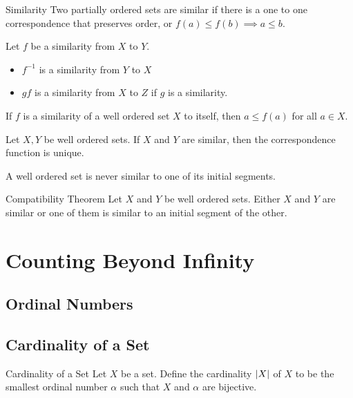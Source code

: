 \documentclass[a4paper]{article}
\begin{document}
\begin{defn}{Similarity}{} Two partially ordered sets are similar if there is a one to one correspondence that preserves order, or $f(a)\leq f(b)\implies a\leq b$. 
\end{defn}

\begin{prp}{}{} Let $f$ be a similarity from $X$ to $Y$. 
\begin{itemize}
\item $f^{-1}$ is a similarity from $Y$ to $X$
\item $gf$ is a similarity from $X$ to $Z$ if $g$ is a similarity. 
\end{itemize}
\end{prp}

\begin{thm}{}{} If $f$ is a similarity of a well ordered set $X$ to itself, then $a\leq f(a)$ for all $a\in X$. 
\end{thm}

\begin{thm}{}{} Let $X,Y$ be well ordered sets. If $X$ and $Y$ are similar, then the correspondence function is unique. 
\end{thm}

\begin{thm}{}{} A well ordered set is never similar to one of its initial segments. 
\end{thm}

\begin{thm}{Compatibility Theorem}{} Let $X$ and $Y$ be well ordered sets. Either $X$ and $Y$ are similar or one of them is similar to an initial segment of the other. 
\end{thm}

\pagebreak
\section{Counting Beyond Infinity}
\subsection{Ordinal Numbers}

\subsection{Cardinality of a Set}
\begin{defn}{Cardinality of a Set}{} Let $X$ be a set. Define the cardinality $\abs{X}$ of $X$ to be the smallest ordinal number $\alpha$ such that $X$ and $\alpha$ are bijective. 
\end{defn}
\end{document}
